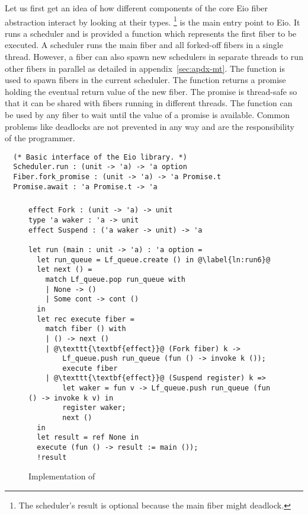 Let us first get an idea of how different components of the core Eio fiber abstraction interact by looking at their types.
\footnote{The scheduler's result is optional because the main fiber might deadlock.} is the main entry point to Eio.
It runs a scheduler and is provided a function which represents the first fiber to be executed.
A scheduler runs the main fiber and all forked-off fibers in a single thread.
However, a fiber can also spawn new schedulers in separate threads to run other fibers in parallel as detailed in appendix~\ref{sec:apdx-mt}.
The  function is used to spawn fibers in the current scheduler.
The function returns a promise holding the eventual return value of the new fiber.
The promise is thread-safe so that it can be shared with fibers running in different threads.
The  function can be used by any fiber to wait until the value of a promise is available.
Common problems like deadlocks are not prevented in any way and are the responsibility of the programmer.


\begin{verbatim}
  (* Basic interface of the Eio library. *)
  Scheduler.run : (unit -> 'a) -> 'a option
  Fiber.fork_promise : (unit -> 'a) -> 'a Promise.t
  Promise.await : 'a Promise.t -> 'a
\end{verbatim}

\subsubsection{}
\label{sec:sched-impl-run}

\begin{figure}[ht]
  \begin{verbatim}
effect Fork : (unit -> 'a) -> unit
type 'a waker : 'a -> unit
effect Suspend : ('a waker -> unit) -> 'a

let run (main : unit -> 'a) : 'a option =
  let run_queue = Lf_queue.create () in @\label{ln:run6}@
  let next () =
    match Lf_queue.pop run_queue with
    | None -> ()
    | Some cont -> cont () 
  in
  let rec execute fiber =
    match fiber () with
    | () -> next ()
    | @\texttt{\textbf{effect}}@ (Fork fiber) k ->
        Lf_queue.push run_queue (fun () -> invoke k ());
        execute fiber
    | @\texttt{\textbf{effect}}@ (Suspend register) k =>
        let waker = fun v -> Lf_queue.push run_queue (fun () -> invoke k v) in
        register waker;
        next ()
  in
  let result = ref None in
  execute (fun () -> result := main ());
  !result
  \end{verbatim}
  \caption{Implementation of }
  \label{fig:sched-impl-run}
\end{figure}

